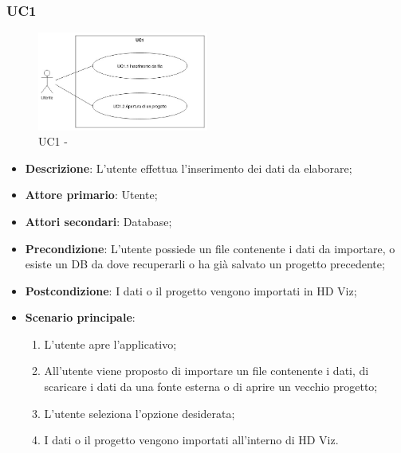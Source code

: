 \subsubsection{UC1}
\label{sub:uc1}

\begin{figure}[h]
    \centering
    \includegraphics[width=0.5\textwidth]{componenti/casi-duso/diagrammi/UC1.jpg}
    \caption{UC1 - }
    \label{fig:UC1}
\end{figure}


\begin{itemize}
    \item{\textbf{Descrizione}}: L'utente effettua l'inserimento dei dati da elaborare;
    \item{\textbf{Attore primario}}: Utente;
    \item{\textbf{Attori secondari}}: Database;
    \item{\textbf{Precondizione}}: L'utente possiede un file contenente i dati da importare, o esiste un DB da dove recuperarli o ha già salvato un progetto precedente;
    \item{\textbf{Postcondizione}}: I dati o il progetto vengono importati in HD Viz;
    \item{\textbf{Scenario principale}}:
    \begin{enumerate}
        \item L'utente apre l'applicativo;
        \item All'utente viene proposto di importare un file contenente i dati, di scaricare i dati da una fonte esterna o di aprire un vecchio progetto;
        \item L'utente seleziona l'opzione desiderata;
        \item I dati o il progetto vengono importati all'interno di HD Viz.
    \end{enumerate}
\end{itemize}


